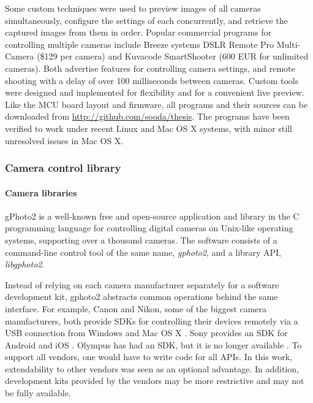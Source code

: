Some custom techniques were used to preview images of all cameras simultaneously, configure the settings of each concurrently, and retrieve the captured images from them in order.
Popular commercial programs for controlling multiple cameras include Breeze systems DSLR Remote Pro Multi-Camera \cite{breezesystemsmulti} (\$129 per camera) and Kuvacode SmartShooter \cite{smartshooter} (600 EUR for unlimited cameras).
Both advertise features for controlling camera settings, and remote shooting with a delay of over 100 milliseconds between cameras.
Custom tools were designed and implemented for flexibility and for a convenient live preview.
Like the MCU board layout and firmware, all programs and their sources can be downloaded from \url {http://github.com/sooda/thesis}.
The programs have been verified to work under recent Linux and Mac OS X systems, with minor still unresolved issues in Mac OS X.


\subsubsection{Camera control library} \label{sec:cameracontrollib} %

\paragraph{Camera libraries}
gPhoto2 \cite{gphoto2} is a well-known free and open-source application and library in the C programming language for controlling digital cameras on Unix-like operating systems, supporting over a thousand cameras.
The software consists of a command-line control tool of the same name, \emph{gphoto2}, and a library API, \emph{libgphoto2}.

Instead of relying on each camera manufacturer separately for a software development kit, gphoto2 abstracts common operations behind the same interface.
For example, Canon and Nikon, some of the biggest camera manufacturers, both provide SDKs for controlling their devices remotely via a USB connection from Windows and Mac OS X \cite{canonedsdk,nikonsdk}.
Sony provides an SDK for Android and iOS \cite{sonysdk}.
Olympus has had an SDK, but it is no longer available \cite{olympussdk}.
To support all vendors, one would have to write code for all APIs.
In this work, extendability to other vendors was seen as an optional advantage.
In addition, development kits provided by the vendors may be more restrictive and may not be fully available.

